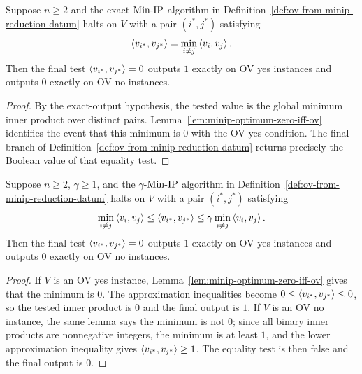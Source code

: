 \begin{lemma}
  \label{lem:exact-minip-output-ov-correct}
  Suppose $n\geq2$ and the exact $\mathrm{Min\mbox{-}IP}$ algorithm in
  Definition~\ref{def:ov-from-minip-reduction-datum} halts on $V$ with a pair
  $(i^*,j^*)$ satisfying
  \[
    \left\langle v_{i^*},v_{j^*}\right\rangle
      =\min_{i\neq j}\left\langle v_i,v_j\right\rangle.
  \]
  Then the final test
  $\left\langle v_{i^*},v_{j^*}\right\rangle=0$ outputs $1$ exactly on OV yes instances and
  outputs $0$ exactly on OV no instances.
\end{lemma}
\begin{proof}
  By the exact-output hypothesis, the tested value is the global minimum inner
  product over distinct pairs.  Lemma~\ref{lem:minip-optimum-zero-iff-ov}
  identifies the event that this minimum is $0$ with the OV yes condition.
  The final branch of Definition~\ref{def:ov-from-minip-reduction-datum}
  returns precisely the Boolean value of that equality test.
\end{proof}

\begin{lemma}
  \label{lem:approx-minip-output-ov-correct}
  Suppose $n\geq2$, $\gamma\geq1$, and the $\gamma$-$\mathrm{Min\mbox{-}IP}$ algorithm in
  Definition~\ref{def:ov-from-minip-reduction-datum} halts on $V$ with a pair
  $(i^*,j^*)$ satisfying
  \[
    \min_{i\neq j}\left\langle v_i,v_j\right\rangle
      \leq \left\langle v_{i^*},v_{j^*}\right\rangle
      \leq \gamma\min_{i\neq j}\left\langle v_i,v_j\right\rangle.
  \]
  Then the final test
  $\left\langle v_{i^*},v_{j^*}\right\rangle=0$ outputs $1$ exactly on OV yes instances and
  outputs $0$ exactly on OV no instances.
\end{lemma}
\begin{proof}
  If $V$ is an OV yes instance, Lemma~\ref{lem:minip-optimum-zero-iff-ov} gives
  that the minimum is $0$.  The approximation inequalities become
  $0\leq\left\langle v_{i^*},v_{j^*}\right\rangle\leq0$, so the tested inner product is $0$ and the
  final output is $1$.  If $V$ is an OV no instance, the same lemma says the
  minimum is not $0$; since all binary inner products are nonnegative integers,
  the minimum is at least $1$, and the lower approximation inequality gives
  $\left\langle v_{i^*},v_{j^*}\right\rangle\geq1$.  The equality test is then false and the final
  output is $0$.
\end{proof}

